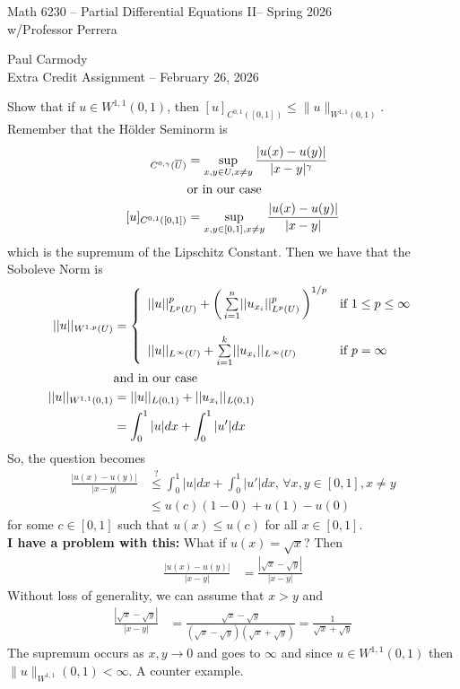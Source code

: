 \documentclass[12pt,a4paper]{report}
\newcommand{\CLASSNAME}{Math 6230 -- Partial Differential Equations II}
\newcommand{\STUDENTNAME}{Paul Carmody}
\newcommand{\ASSIGNMENT}{Extra Credit Assignment }
\newcommand{\DUEDATE}{February 26, 2026}
\newcommand{\PROFESSOR}{Professor Perrera}
\newcommand{\SEMESTER}{Spring 2026}
\newcommand{\HSPACE}[3]{C^{#1,#2}(#3)}
\newcommand{\HSEMINORM}[4]{[ #4 ]_{\HSPACE{#1}{#2}{#3}}}
\newcommand{\SSPACE}[3]{{W^{#1,#2}(#3)}}
\begin{document}
\begin{center}
	\Large{\CLASSNAME -- \SEMESTER} \\
	\large{ w/\PROFESSOR}
\end{center}
\begin{center}
	\STUDENTNAME \\
	\ASSIGNMENT -- \DUEDATE\\
\end{center} 

Show that if $u \in W^{1,1}(0,1)$, then $[u]_{C^{0,1}([0,1])} \le \| u \|_{W^{1,1}(0,1)}$.\\

\noindent Remember that the H\"older Seminorm is
	\begin{align*}
		\HSEMINORM{0}{\gamma}{\CONJ{U}}{u} &= \sup_{x,y \in U,x\ne y}\frac{|u(x)-u(y)|}{|x-y|^\gamma} \\
		&\text{or in our case}\\
		\HSEMINORM{0}{1}{[0,1]}{u} &= \sup_{x,y \in [0,1],x\ne y}\frac{|u(x)-u(y)|}{|x-y|}
	\end{align*}which is the supremum of the Lipschitz Constant.  Then we have that the Soboleve Norm is 	\begin{align*}
		||u||_{\SSPACE{1}{p}{U}} &= \BINDEF{||u||^p_{L^p(U)} + \PAREN{\SUM{i=1}{n} ||u_{x_i}||^p_{L^p(U)}}^{1/p} & \text{if } 1\le p\le \infty \\}{||u||_{L^\infty(U)} + \SUM{i=1}{k} ||u_{x_i}||_{L^\infty(U)} & \text{if }p = \infty} \\
		&\text{and in our case} \\
		||u||_{\SSPACE{1}{1}{0,1}} &=||u||_{L(0,1)} + ||u_{x_i}||_{L(0,1)} \\
		&= \int_0^1 |u| dx + \int_0^1 |u'| dx 
	\end{align*}So, the question becomes
	\begin{align*}
		\frac{|u(x)-u(y)|}{|x-y|} &\overset{?}\le \int_0^1 |u| dx + \int_0^1 |u'| dx, \, \forall x,y \in [0,1], x \ne y \\
		&\le u(c)(1-0) + u(1)-u(0)
	\end{align*}for some $c \in [0,1]$ such that $u(x) \le u(c)$ for all $x \in [0,1]$.\\
	
	\textbf{I have a problem with this: } What if $u(x) = \sqrt{x}$?  Then
	\begin{align*}
		\frac{|u(x)-u(y)|}{|x-y|} &= \frac{|\sqrt{x}-\sqrt{y}|}{|x-y|} 
	\end{align*}Without loss of generality, we can assume that $x > y$ and 
	\begin{align*}
		\frac{|\sqrt{x}-\sqrt{y}|}{|x-y|}  &= \frac{\sqrt{x}-\sqrt{y}}{(\sqrt{x}-\sqrt{y})(\sqrt{x}+\sqrt{y})} = \frac{1}{\sqrt{x}+\sqrt{y}} 
	\end{align*}The supremum occurs as $x,y \to 0$ and goes to $\infty$ and since $u \in W^{1,1}(0,1)$ then $\|u\|_{W^{1,1}}(0,1) < \infty$. A counter example.
\end{document}
